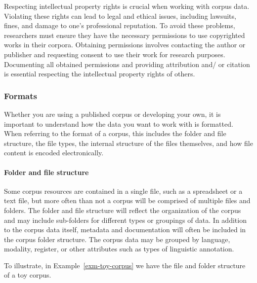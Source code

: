 \documentclass[
  letterpaper,
  DIV=11,
  numbers=noendperiod]{scrreport}
\let\oldparagraph\paragraph
\renewcommand{\paragraph}[1]{\oldparagraph{#1}\mbox{}}
\theoremstyle{definition}
\theoremstyle{remark}
\begin{document}
Respecting intellectual property rights is crucial when working with
corpus data. Violating these rights can lead to legal and ethical
issues, including lawsuits, fines, and damage to one's professional
reputation. To avoid these problems, researchers must ensure they have
the necessary permissions to use copyrighted works in their corpora.
Obtaining permissions involves contacting the author or publisher and
requesting consent to use their work for research purposes. Documenting
all obtained permissions and providing attribution and/ or citation is
essential respecting the intellectual property rights of others.

\hypertarget{formats}{%
\subsubsection{Formats}\label{formats}}

Whether you are using a published corpus or developing your own, it is
important to understand how the data you want to work with is formatted.
When referring to the format of a corpus, this includes the folder and
file structure, the file types, the internal structure of the files
themselves, and how file content is encoded electronically.

\hypertarget{folder-and-file-structure}{%
\paragraph{Folder and file structure}\label{folder-and-file-structure}}

Some corpus resources are contained in a single file, such as a
spreadsheet or a text file, but more often than not a corpus will be
comprised of multiple files and folders. The folder and file structure
will reflect the organization of the corpus and may include sub-folders
for different types or groupings of data. In addition to the corpus data
itself, metadata and documentation will often be included in the corpus
folder structure. The corpus data may be grouped by language, modality,
register, or other attributes such as types of linguistic annotation.

To illustrate, in Example~\ref{exm-toy-corpus} we have the file and
folder structure of a toy corpus.
\end{document}
